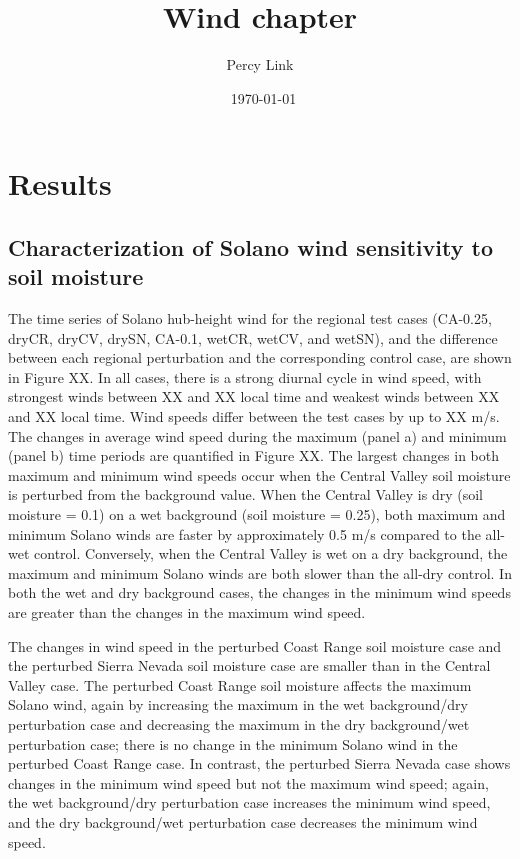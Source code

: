 \documentclass[12pt]{amsart}
\title{Wind chapter}
\author{Percy Link}
\date{\currenttime \ \today} %
\begin{document}
\maketitle

\section{Results}

\subsection{Characterization of Solano wind sensitivity to soil moisture}

The time series of Solano hub-height wind for the regional test cases (CA-0.25, dryCR, dryCV, drySN, CA-0.1, wetCR, wetCV, and wetSN), and the difference between each regional perturbation and the corresponding control case, are shown in Figure XX.  In all cases, there is a strong diurnal cycle in wind speed, with strongest winds between XX and XX local time and weakest winds between XX and XX local time.  Wind speeds differ between the test cases by up to XX m/s.  The changes in average wind speed during the maximum (panel a) and minimum (panel b) time periods are quantified in Figure XX.  The largest changes in both maximum and minimum wind speeds occur when the Central Valley soil moisture is perturbed from the background value.  When the Central Valley is dry (soil moisture = 0.1) on a wet background (soil moisture = 0.25), both maximum and minimum Solano winds are faster by approximately 0.5 m/s compared to the all-wet control.  Conversely, when the Central Valley is wet on a dry background, the maximum and minimum Solano winds are both slower than the all-dry control.  In both the wet and dry background cases, the changes in the minimum wind speeds are greater than the changes in the maximum wind speed.

The changes in wind speed in the perturbed Coast Range soil moisture case and the perturbed Sierra Nevada soil moisture case are smaller than in the Central Valley case.  The perturbed Coast Range soil moisture affects the maximum Solano wind, again by increasing the maximum in the wet background/dry perturbation case and decreasing the maximum in the dry background/wet perturbation case; there is no change in the minimum Solano wind in the perturbed Coast Range case.  In contrast, the perturbed Sierra Nevada case shows changes in the minimum wind speed but not the maximum wind speed; again, the wet background/dry perturbation case increases the minimum wind speed, and the dry background/wet perturbation case decreases the minimum wind speed.
\end{document}
